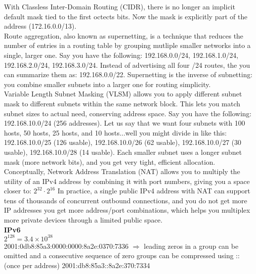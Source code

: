 \documentclass{article}
\begin{document}
With Classless Inter-Domain Routing (CIDR), there is no longer an implicit default mask tied to the first octects bits. Now the mask is explicitly part of the address (172.16.0.0/13).\\

Route aggregation, also known as supernetting, is a technique that reduces the number of entries in a routing table by grouping mutliple smaller networks into a single, larger one. Say you have the following: 192.168.0.0/24, 192.168.1.0/24, 192.168.2.0/24, 192.168.3.0/24. Instead of advertising all four /24 routes, the you can summarize them as: 192.168.0.0/22. Supernetting is the inverse of subnetting: you combine smaller subnets into a larger one for routing simplicity.\\

Variable Length Subnet Masking (VLSM) allows you to apply different subnet mask to different subnets within the same network block. This lets you match subnet sizes to actual need, conserving address space. Say you have the following: 192.168.10.0/24 (256 addresses). Let us say that we want four subnets with 100 hosts, 50 hosts, 25 hosts, and 10 hosts...well you might divide in like this: 192.168.10.0/25 (126 usable), 192.168.10.0/26 (62 usable), 192.168.10.0/27 (30 usable), 192.168.10.0/28 (14 usable). Each smaller subnet uses a longer subnet mask (more network bits), and you get very tight, efficient allocation.\\

Conceptually, Network Address Translation (NAT) allows you to multiply the utility of an IPv4 address by combining it with port numbers, giving you a space closer to: $2^{32} \cdot 2^{16}$ In practice, a single public IPv4 address with NAT can support tens of thousands of concurrent outbound connections, and you do not get more IP addresses you get more address/port combinations, which helps you multiplex more private devices through a limited public space.\\

\textbf{IPv6}\\
$2^128 = 3.4 \times 10^{38}$\\
2001:0db8:85a3:0000:0000:8a2e:0370:7336 $\Rightarrow$ leading zeros in a group can be omitted and a consecutive sequence of zero groups can be compressed using :: (once per address) 2001:db8:85a3::8a2e:370:7334\\
\end{document}
